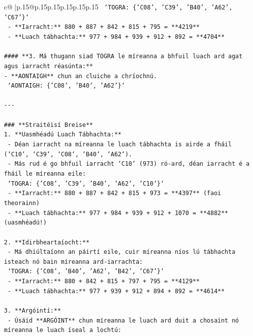 \documentclass{article}
\begin{document}
{\begin{supertabular}{c@{$\;$}|p{.15\linewidth}@{}p{.15\linewidth}p{.15\linewidth}p{.15\linewidth}p{.15\linewidth}p{.15\linewidth}}
{{{\texttt{    `TOGRA: \{'C08', 'C39', 'B40', 'A62', 'C67'\}`} \\
\texttt{    {-} **Iarracht:** 880 + 887 + 842 + 815 + 795 = **4219**} \\
\texttt{    {-} **Luach tábhachta:** 977 + 984 + 939 + 912 + 892 = **4704**} \\
\\ 
\texttt{\#\#\#\# **3. Má thugann siad TOGRA le míreanna a bhfuil luach ard agat agus iarracht réasúnta:**} \\
\texttt{{-} **AONTAIGH** chun an cluiche a chríochnú.} \\
\texttt{  `AONTAIGH: \{'C08', 'B40', 'A62'\}`} \\
\\ 
\texttt{{-}{-}{-}} \\
\\ 
\texttt{\#\#\# **Straitéisí Breise**} \\
\texttt{1. **Uasmhéadú Luach Tábhachta:**} \\
\texttt{   {-} Déan iarracht na míreanna le luach tábhachta is airde a fháil (`C10`, `C39`, `C08`, `B40`, `A62`).} \\
\texttt{   {-} Más rud é go bhfuil iarracht `C10` (973) ró{-}ard, déan iarracht é a fháil le míreanna eile:} \\
\texttt{     `TOGRA: \{'C08', 'C39', 'B40', 'A62', 'C10'\}`} \\
\texttt{     {-} **Iarracht:** 880 + 887 + 842 + 815 + 973 = **4397** (faoi theorainn)} \\
\texttt{     {-} **Luach tábhachta:** 977 + 984 + 939 + 912 + 1070 = **4882** (uasmhéadú!)} \\
\\ 
\texttt{2. **Idirbheartaíocht:**} \\
\texttt{   {-} Má dhiúltaíonn an páirtí eile, cuir míreanna níos lú tábhachta isteach nó bain míreanna ard{-}iarrachta:} \\
\texttt{     `TOGRA: \{'C08', 'B40', 'A62', 'B42', 'C67'\}`} \\
\texttt{     {-} **Iarracht:** 880 + 842 + 815 + 797 + 795 = **4129**} \\
\texttt{     {-} **Luach tábhachta:** 977 + 939 + 912 + 894 + 892 = **4614**} \\
\\ 
\texttt{3. **Argóintí:**} \\
\texttt{   {-} Úsáid **ARGÓINT** chun míreanna le luach ard duit a chosaint nó míreanna le luach íseal a lochtú:} \\
}}}
\end{supertabular}}
\end{document}
